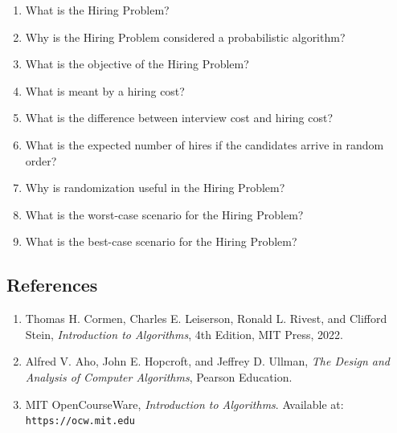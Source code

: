 \documentclass[12pt,a4paper]{article}
\begin{document}
\begin{enumerate}
    \item What is the Hiring Problem?
    
    \item Why is the Hiring Problem considered a probabilistic algorithm?
    
    \item What is the objective of the Hiring Problem?
            
    \item What is meant by a hiring cost?
    
    \item What is the difference between interview cost and hiring cost?
           
    \item What is the expected number of hires if the candidates arrive in random order?
    \item Why is randomization useful in the Hiring Problem?
    
    \item What is the worst-case scenario for the Hiring Problem?
    
    \item What is the best-case scenario for the Hiring Problem?
   
\end{enumerate}

\subsection*{References}

\begin{enumerate}
    \item Thomas H. Cormen, Charles E. Leiserson, Ronald L. Rivest, and Clifford Stein, \textit{Introduction to Algorithms}, 4th Edition, MIT Press, 2022.    
      
    \item Alfred V. Aho, John E. Hopcroft, and Jeffrey D. Ullman, \textit{The Design and Analysis of Computer Algorithms}, Pearson Education.    
       
    \item MIT OpenCourseWare, \textit{Introduction to Algorithms}. Available at: \texttt{https://ocw.mit.edu}  
   
\end{enumerate}
\end{document}
